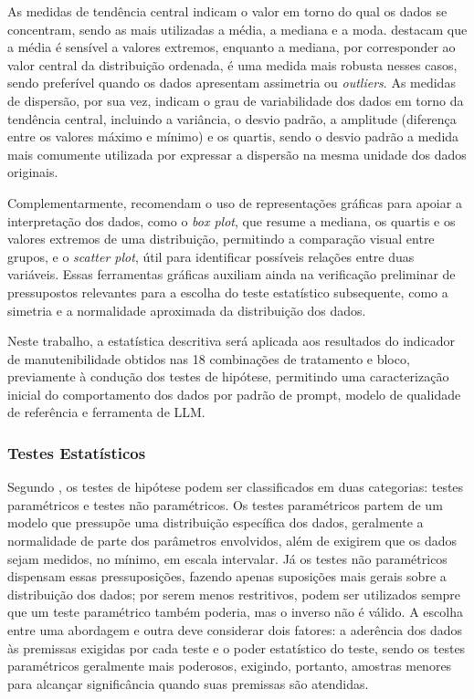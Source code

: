 As medidas de tendência central indicam o valor em torno do qual os dados se concentram, sendo as mais utilizadas a média, a mediana e a moda.  destacam que a média é sensível a valores extremos, enquanto a mediana, por corresponder ao valor central da distribuição ordenada, é uma medida mais robusta nesses casos, sendo preferível quando os dados apresentam assimetria ou \textit{outliers}. As medidas de dispersão, por sua vez, indicam o grau de variabilidade dos dados em torno da tendência central, incluindo a variância, o desvio padrão, a amplitude (diferença entre os valores máximo e mínimo) e os quartis, sendo o desvio padrão a medida mais comumente utilizada por expressar a dispersão na mesma unidade dos dados originais.

Complementarmente,  recomendam o uso de representações gráficas para apoiar a interpretação dos dados, como o \textit{box plot}, que resume a mediana, os quartis e os valores extremos de uma distribuição, permitindo a comparação visual entre grupos, e o \textit{scatter plot}, útil para identificar possíveis relações entre duas variáveis. Essas ferramentas gráficas auxiliam ainda na verificação preliminar de pressupostos relevantes para a escolha do teste estatístico subsequente, como a simetria e a normalidade aproximada da distribuição dos dados.

Neste trabalho, a estatística descritiva será aplicada aos resultados do indicador de manutenibilidade obtidos nas 18 combinações de tratamento e bloco, previamente à condução dos testes de hipótese, permitindo uma caracterização inicial do comportamento dos dados por padrão de prompt, modelo de qualidade de referência e ferramenta de LLM.

\subsubsection{Testes Estatísticos}

Segundo , os testes de hipótese podem ser classificados em duas categorias: testes paramétricos e testes não paramétricos. Os testes paramétricos partem de um modelo que pressupõe uma distribuição específica dos dados, geralmente a normalidade de parte dos parâmetros envolvidos, além de exigirem que os dados sejam medidos, no mínimo, em escala intervalar. Já os testes não paramétricos dispensam essas pressuposições, fazendo apenas suposições mais gerais sobre a distribuição dos dados; por serem menos restritivos, podem ser utilizados sempre que um teste paramétrico também poderia, mas o inverso não é válido. A escolha entre uma abordagem e outra deve considerar dois fatores: a aderência dos dados às premissas exigidas por cada teste e o poder estatístico do teste, sendo os testes paramétricos geralmente mais poderosos, exigindo, portanto, amostras menores para alcançar significância quando suas premissas são atendidas.

